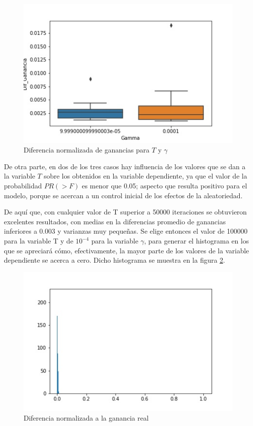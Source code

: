 \begin{figure}[H]
	\centering
	\includegraphics[scale=0.5]{cajasGamma_exp4.jpg}
	\caption{Diferencia normalizada de ganancias para $T$ y $\gamma$}
	\label{CajasGamma}
\end{figure}

De otra parte, en dos de los tres casos hay influencia de los valores que se dan a la variable $T$ sobre los obtenidos en la variable dependiente, ya que el valor de la probabilidad $PR(>F)$ es menor que 0.05; aspecto que resulta positivo para el modelo, porque se acercan a un control inicial de los efectos de la aleatoriedad.

De aquí que, con cualquier valor de T superior a 50000 iteraciones se obtuvieron excelentes resultados, con medias en la diferencias promedio de ganancias inferiores a 0.003 y varianzas muy pequeñas. Se elige entonces el valor de 100000 para la variable T y de $10^{-4}$ para la variable $\gamma$, para generar el histograma en los que se apreciará cómo, efectivamente, la mayor parte de los valores de la variable dependiente se acerca a cero. Dicho histograma se muestra en la figura \ref{histo4}.

\begin{figure}[H]
	\centering
	\includegraphics[scale=0.5]{Histograma_gamma3.jpg}
	\caption{Diferencia normalizada a la ganancia real}
	\label{histo4}
\end{figure}

